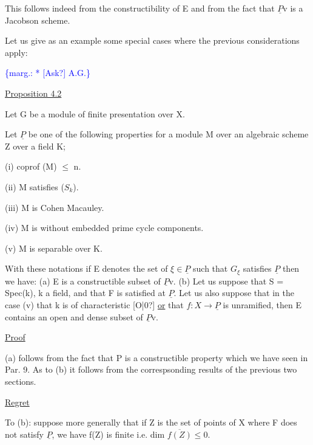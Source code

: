 \documentclass[11pt]{article}
\newcommand{\scanpage}[1]{\par\bigskip\noindent{\small\sffamily[scan #1]}\par}
\newcommand{\mspage}[1]{{\small\sffamily[p.\,#1]}}
\newcommand{\margin}[1]{\textcolor{blue}{\{\textsf{marg.:} #1\}}}
\newcommand{\uline}[1]{\underline{#1}}
\newcommand{\unsure}[1]{[#1?]}
\begin{document}
This follows indeed from the constructibility of E and from
the fact that $\underline{P}$v is a Jacobson scheme.

Let us give as an example some special cases where the
previous considerations apply:

\margin{* \unsure{Ask} A.G.}

\clearpage
\scanpage{24/23}
\mspage{23}

\uline{Proposition 4.2}

Let G be a module of finite presentation over X.

Let $\underline{P}$ be one of the following properties for a module M over
an algebraic scheme Z over a field K;

(i) coprof (M) $\leq$ n.

(ii) M satisfies ($S_k$).

(iii) M is Cohen Macauley.

(iv) M is without embedded prime cycle components.

(v) M is separable over K.

With these notations if E denotes the set of $\xi \in \underline{P}$ such that $G_\xi$
satisfies $\underline{P}$ then we have: (a) E is a constructible subset of $\underline{P}$v.
(b) Let us suppose that S = Spec(k), k a field, and that F is
satisfied at $\underline{P}$. Let us also suppose that in the case (v) that k
is of characteristic \unsure{O|0} \uline{or} that $f\colon X \to \underline{P}$ is unramified, then E
contains an open and dense subset of $\underline{P}$v.

\uline{Proof}

(a) follows from the fact that P is a constructible property
which we have seen in Par. 9. As to (b) it follows from the
correspsonding results of the previous two sections.

\uline{Regret}

To (b): suppose more generally that if Z is the set of
points of X where F does not satisfy $\underline{P}$, we have f(Z) is finite
i.e. dim $\overline{f(Z)} \leq 0$.

\clearpage
\scanpage{24/24}
\mspage{24}
\end{document}
